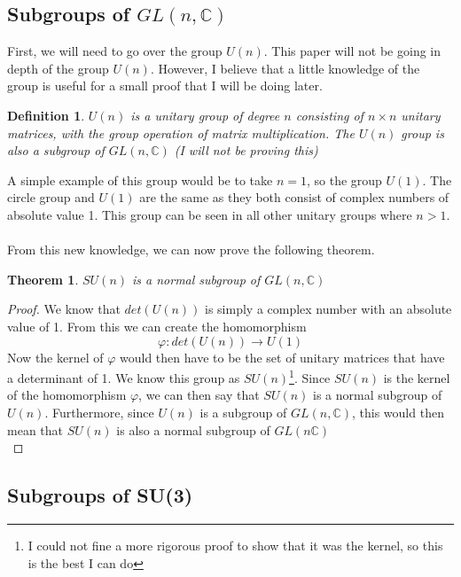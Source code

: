\documentclass[12pt]{article}
\newcommand{\C}{\mathbb{C}}
\newtheorem{thm}{Theorem}[section]
\newtheorem{definition}{Definition}
\begin{document}
\subsection{Subgroups of $GL(n,\C)$}
First, we will need to go over the group $U(n)$. This paper will not be going in depth of the group $U(n)$. However, I believe that a little knowledge of the group is useful for a small proof that I will be doing later.
\begin{definition}
$U(n)$ is a unitary group of degree $n$ consisting of $n \times n$ unitary matrices, with the group operation of matrix multiplication. The $U(n)$ group is also a subgroup of $GL(n,\C)$ (I will not be proving this)
\end{definition}
A simple example of this group would be to take $n=1$, so the group $U(1)$. The circle group and $U(1)$ are the same as they both consist of complex numbers of absolute value 1. This group can be seen in all other unitary groups where $n > 1$. \\\\
From this new knowledge, we can now prove  the following theorem.
\begin{thm}
$SU(n)$ is a normal subgroup of $GL(n,\C)$
\end{thm}
\begin{proof}
We know that $det(U(n))$ is simply a complex number with an absolute value of 1. From this we can create the homomorphism
\[ \varphi:det(U(n)) \rightarrow U(1) \]
Now the kernel of $\varphi$ would then have to be the set of unitary matrices that have a determinant of 1. We know this group as $SU(n)$\footnote{I could not fine a more rigorous proof to show that it was the kernel, so this is the best I can do}. Since $SU(n)$ is the kernel of the homomorphism $\varphi$, we can then say that $SU(n)$ is a normal subgroup of $U(n)$. Furthermore, since $U(n)$ is a subgroup of $GL(n,\C)$, this would then mean that $SU(n)$ is also a normal subgroup of $GL(n\C)$\\
\end{proof}

\subsection{Subgroups of SU(3)}
\end{document}
